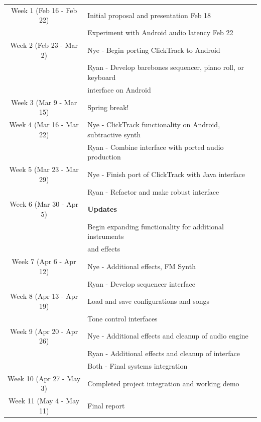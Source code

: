 \documentclass[letterpaper,12pt]{article}
\begin{document}
\onehalfspacing
\centering
\begin{tabular}{ c | l }  

  Week 1 (Feb 16 - Feb 22) & Initial proposal and presentation Feb 18 \\ 
                           & Experiment with Android audio latency Feb 22 \\ \hline
  Week 2 (Feb 23 - Mar 2)  & Nye - Begin porting ClickTrack to Android \\
                           & Ryan - Develop barebones sequencer, piano roll, or keyboard \\ &interface on Android \\ \hline
  Week 3 (Mar 9 - Mar 15)  & Spring break!  \\ \hline
  Week 4 (Mar 16 - Mar 22) & Nye - ClickTrack functionality on Android, subtractive synth \\ 
                           & Ryan - Combine interface with ported audio production \\ \hline
  Week 5 (Mar 23 - Mar 29) & Nye - Finish port of ClickTrack with Java interface \\
                           & Ryan - Refactor and make robust interface \\ \hline
  Week 6 (Mar 30 - Apr 5)  & \textbf{Updates} \\
                           & Begin expanding functionality for additional instruments \\ & and effects\\ \hline
  Week 7 (Apr 6 - Apr 12)  & Nye - Additional effects, FM Synth \\
                           & Ryan - Develop sequencer interface \\ \hline
  Week 8 (Apr 13 - Apr 19) & Load and save configurations and songs \\
                           & Tone control interfaces \\ \hline
  Week 9 (Apr 20 - Apr 26) & Nye - Additional effects and cleanup of audio engine \\
                           & Ryan - Additional effects and cleanup of interface \\ 
                           & Both - Final systems integration \\ \hline
  Week 10 (Apr 27 - May 3) & Completed project integration and working demo  \\ \hline
  Week 11 (May 4 - May 11) & Final report  \\ 
\end{tabular}
  
\end{document}
